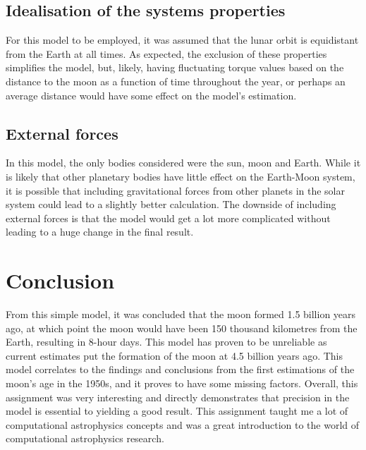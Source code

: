\documentclass[final,5p,times,twocolumn,authoryear]{elsarticle}
\begin{document}
\subsection{Idealisation of the systems properties}
For this model to be employed, it was assumed that the lunar orbit is equidistant from the Earth at all times. As expected, the exclusion of these properties simplifies the model, but, likely, having fluctuating torque values based on the distance to the moon as a function of time throughout the year, or perhaps an average distance would have some effect on the model's estimation. 

\subsection{External forces}
In this model, the only bodies considered were the sun, moon and Earth. While it is likely that other planetary bodies have little effect on the Earth-Moon system, it is possible that including gravitational forces from other planets in the solar system could lead to a slightly better calculation. The downside of including external forces is that the model would get a lot more complicated without leading to a huge change in the final result. 

\section{Conclusion}
From this simple model, it was concluded that the moon formed 1.5 billion years ago, at which point the moon would have been 150 thousand kilometres from the Earth, resulting in 8-hour days. This model has proven to be unreliable as current estimates put the formation of the moon at 4.5 billion years ago. This model correlates to the findings and conclusions from the first estimations of the moon's age in the 1950s, and it proves to have some missing factors. Overall, this assignment was very interesting and directly demonstrates that precision in the model is essential to yielding a good result. This assignment taught me a lot of computational astrophysics concepts and was a great introduction to the world of computational astrophysics research. 

\newpage
\end{document}
